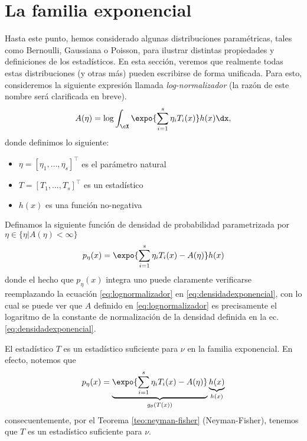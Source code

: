 \section{La familia exponencial}

Hasta este punto, hemos considerado algunas distribuciones paramétricas, tales como Bernoulli, Gaussiana o Poisson, para ilustrar distintas propiedades y definiciones de los estadísticos. En esta sección, veremos que realmente todas estas distribuciones (y otras más) pueden escribirse de forma unificada. Para esto, consideremos la siguiente expresión llamada \textit{log-normalizador} (la razón de este nombre será clarificada en breve).
\begin{equation}
	\label{eq:lognormalizador}
	A(\eta) = \log\int_\cX \expo{\sum_{i=1}^s\eta_iT_i(x)}h(x)\dx,
\end{equation}
donde definimos lo siguiente:
\begin{itemize}
	\item $\eta = [\eta_1,\ldots,\eta_s]^\top$ es el parámetro natural
	\item $T = [T_1,\ldots,T_s]^\top$ es un estadístico
	\item $h(x)$ es una función no-negativa
\end{itemize}
Definamos la siguiente función de densidad de probabilidad parametrizada por $\eta\in\{\eta | A(\eta)<\infty\}$
\begin{equation}
	\label{eq:densidadexponencial}
 	p_\eta(x) = \expo{\sum_{i=1}^s\eta_iT_i(x)-A(\eta)}h(x)
 \end{equation} 
 donde el hecho que $p_\eta(x)$ integra uno puede claramente verificarse reemplazando la ecuación \eqref{eq:lognormalizador} en \eqref{eq:densidadexponencial}, con lo cual se puede ver que $A$ definido en \eqref{eq:lognormalizador} es precisamente el logaritmo de la constante de normalización de la densidad definida en la ec.~ \eqref{eq:densidadexponencial}.
 
\begin{remark}
 El estadístico $T$ es un estadístico suficiente para $\nu$ en la familia exponencial. En efecto, notemos que 
 \begin{equation}
	\label{eq:densidadexponencial2}
 	p_\eta(x) = \underbrace{\expo{\sum_{i=1}^s\eta_iT_i(x)-A(\eta)}}_{g_\theta(T(x))}\underbrace{h(x)}_{h(x)}
 \end{equation} 
consecuentemente, por el Teorema  \ref{teo:neyman-fisher} (Neyman-Fisher), tenemos que $T$ es un estadístico suficiente para $\nu$.
\end{remark}



